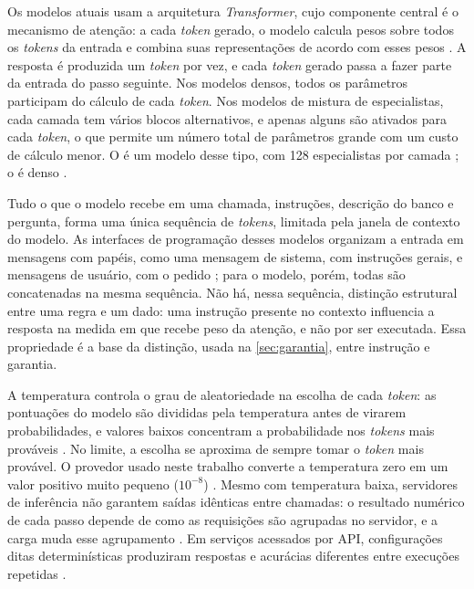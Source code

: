 Os modelos atuais usam a arquitetura \textit{Transformer}, cujo
componente central é o mecanismo de atenção: a cada \textit{token}
gerado, o modelo calcula pesos sobre todos os \textit{tokens} da entrada e
combina suas representações de acordo com esses pesos
\cite{vaswani2017attention}. A resposta é produzida um \textit{token} por
vez, e cada \textit{token} gerado passa a fazer parte da entrada do passo
seguinte. Nos modelos densos, todos os parâmetros participam do cálculo de
cada \textit{token}. Nos modelos de mistura de especialistas, cada camada
tem vários blocos alternativos, e apenas alguns são ativados para cada
\textit{token}, o que permite um número total de parâmetros grande com um
custo de cálculo menor. O  é um modelo desse tipo, com
128 especialistas por camada \cite{openai2025gptoss}; o
 é denso \cite{qwen2026qwen38}.

Tudo o que o modelo recebe em uma chamada, instruções, descrição do banco e
pergunta, forma uma única sequência de \textit{tokens}, limitada pela
janela de contexto do modelo. As interfaces de programação desses modelos
organizam a entrada em mensagens com papéis, como uma mensagem de sistema,
com instruções gerais, e mensagens de usuário, com o pedido
\cite{groq_openai}; para o modelo, porém, todas são concatenadas na mesma
sequência. Não há, nessa sequência, distinção estrutural entre uma regra e
um dado: uma instrução presente no contexto influencia a resposta na
medida em que recebe peso da atenção, e não por ser executada. Essa
propriedade é a base da distinção, usada na \autoref{sec:garantia}, entre
instrução e garantia.

A temperatura controla o grau de aleatoriedade na escolha de cada
\textit{token}: as pontuações do modelo são divididas pela temperatura
antes de virarem probabilidades, e valores baixos concentram a
probabilidade nos \textit{tokens} mais prováveis \cite{holtzman2020curious}.
No limite, a escolha se aproxima de sempre tomar o \textit{token} mais
provável. O provedor usado neste trabalho converte a temperatura zero em
um valor positivo muito pequeno ($10^{-8}$) \cite{groq_openai}. Mesmo com
temperatura baixa, servidores de inferência não garantem saídas idênticas
entre chamadas: o resultado numérico de cada passo depende de como as
requisições são agrupadas no servidor, e a carga muda esse agrupamento
\cite{he2025nondeterminism}. Em serviços acessados por API, configurações
ditas determinísticas produziram respostas e acurácias diferentes entre
execuções repetidas \cite{atil2025nondeterminism}.

